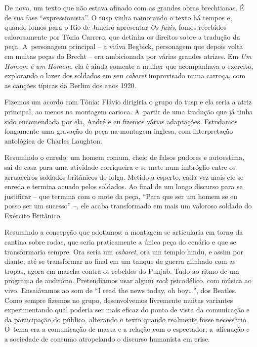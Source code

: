 De novo, um texto que não estava afinado com as grandes obras
brechtianas. É de sua fase “expressionista”. O {\sc tusp} vinha namorando o
texto há tempos e, quando fomos para o Rio de Janeiro apresentar {\it Os
fuzis}, fomos recebidos calorosamente por Tônia Carrero, que detinha os
direitos sobre a tradução da peça. A~personagem principal -- a viúva Begbick,
personagem que depois volta em muitas peças do Brecht -- era ambicionada por
várias grandes atrizes. Em {\it Um Homem é um Homem}, ela é
ainda somente a mulher que acompanhava o exército, explorando o lazer
dos soldados em seu {\it cabaret} improvisado numa carroça, com as
canções típicas da Berlim dos anos 1920.

Fizemos um acordo com Tônia: Flávio dirigiria o grupo do {\sc tusp} e ela
seria a atriz principal, ao menos na montagem carioca. A~partir de uma
tradução que já tinha sido encomendada por ela, André e eu fizemos
várias adaptações. Estudamos longamente uma gravação da peça na montagem
inglesa, com interpretação antológica de Charles Laughton.

Resumindo o enredo: um homem comum, cheio de falsos pudores e autoestima,
sai de casa para uma atividade corriqueira e se mete num imbróglio entre
os arruaceiros soldados britânicos de folga. Metido a esperto, cada vez
mais ele se enreda e termina acuado pelos soldados. Ao final de um longo
discurso para se justificar -- que termina com o mote da peça, “Para que ser
um homem se eu posso ser um sucesso” --, ele acaba transformado em mais um
valoroso soldado do Exército Britânico.

Resumindo a concepção que adotamos: a montagem se articularia em torno da
cantina sobre rodas, que seria praticamente a única peça do cenário e
que se transformaria sempre. Ora seria um {\it cabaret}, ora um templo
hindu, e assim por diante, até se transformar no final em um tanque de
guerra alinhado com as tropas, agora em marcha contra os rebeldes do
Punjab. Tudo ao ritmo de um programa de auditório. Pretendíamos usar
algum {\it rock} psicodélico, com música ao vivo.
Ensaiávamos ao som de “I read the news today, oh boy\ldots”, dos Beatles.
Como sempre fizemos no grupo, desenvolvemos livremente muitas variantes
experimentando qual poderia ser mais eficaz do ponto de vista da
comunicação e da participação do público, alterando o texto quando
realmente fosse necessário. O~tema era a comunicação de massa e a
relação com o espectador; a~alienação e a sociedade de consumo
atropelando o discurso humanista em crise.

\subject{Repressão política e fim do {\cap tusp}}

